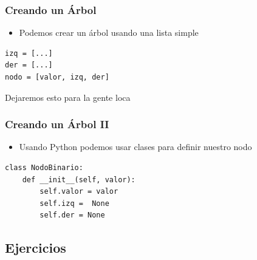 \documentclass[11pt]{beamer}
\begin{document}
	\begin{frame}[fragile]\frametitle{Creando un Árbol}
	\begin{itemize}
	\item Podemos crear un árbol usando una lista simple
	\end{itemize}
	\begin{lstlisting}
izq = [...]
der = [...]
nodo = [valor, izq, der]
\end{lstlisting}
	\pause
	\begin{alertblock}{}
	\centering \Large Dejaremos esto para la gente loca
	\end{alertblock}
	\end{frame}

	\begin{frame}[fragile]\frametitle{Creando un Árbol II}
	\begin{itemize}
	\item Usando Python podemos usar clases para definir nuestro nodo
	\end{itemize}
	\pause
	\begin{lstlisting}
class NodoBinario:
    def __init__(self, valor):
        self.valor = valor
        self.izq =  None
        self.der = None
\end{lstlisting}
	\end{frame}

	\subsection{Ejercicios}
\end{document}
